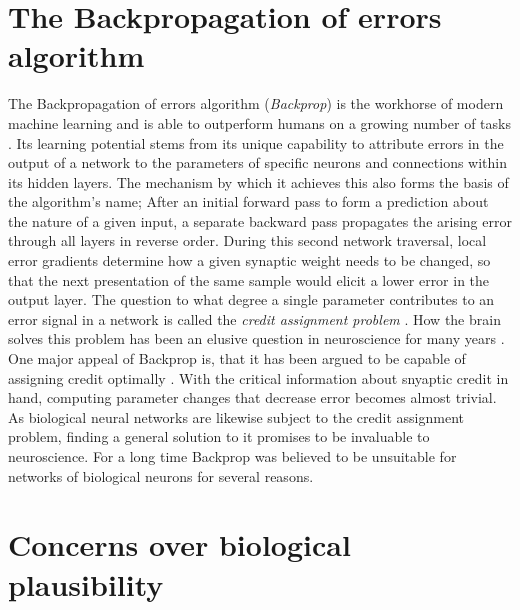 \section{The Backpropagation of errors algorithm}

The Backpropagation of errors algorithm (\textit{Backprop}) \citep{Schmidhuber2014} is the workhorse of modern machine
learning and is able to outperform humans on a growing number of tasks \citep{LeCun2015}. Its learning potential stems
from its unique capability to attribute errors in the output of a network to the parameters of specific neurons and
connections within its hidden layers. The mechanism by which it achieves this also forms the basis of the algorithm's
name; After an initial forward pass to form a prediction about the nature of a given input, a separate backward pass
propagates the arising error through all layers in reverse order. During this second network traversal, local error
gradients determine how a given synaptic weight needs to be changed, so that the next presentation of the same sample
would elicit a lower error in the output layer. The question to what degree a single parameter contributes to an error
signal in a network is called the \textit{credit assignment problem} \citep{minsky1961steps}. How the brain solves this
problem has been an elusive question in neuroscience for many years \citep{Schmidhuber2015,Richards2019}. One major
appeal of Backprop is, that it has been argued to be capable of assigning credit optimally \citep{Lillicrap2020}. With
the critical information about snyaptic credit in hand, computing parameter changes that decrease error becomes almost
trivial. As biological neural networks are likewise subject to the credit assignment problem, finding a general solution
to it promises to be invaluable to neuroscience. For a long time Backprop was believed to be unsuitable for networks of
biological neurons for several reasons.


\section{Concerns over biological plausibility}

